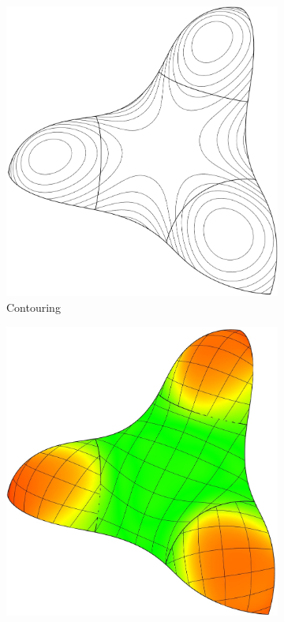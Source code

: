 \documentclass{article}
\begin{document}
\begin{figure}[h!]
\begin{subfigure}{0.23\textwidth}
    \includegraphics[width = \textwidth]{images/trebol3-contour.jpg}
    \caption{Contouring}
    \label{fig:trebol-contour}
  \end{subfigure}
  \begin{subfigure}{0.23\textwidth}
    \includegraphics[width = \textwidth]{images/trebol3-mean-iso.jpg}

\end{subfigure}
\end{figure}
\end{document}
